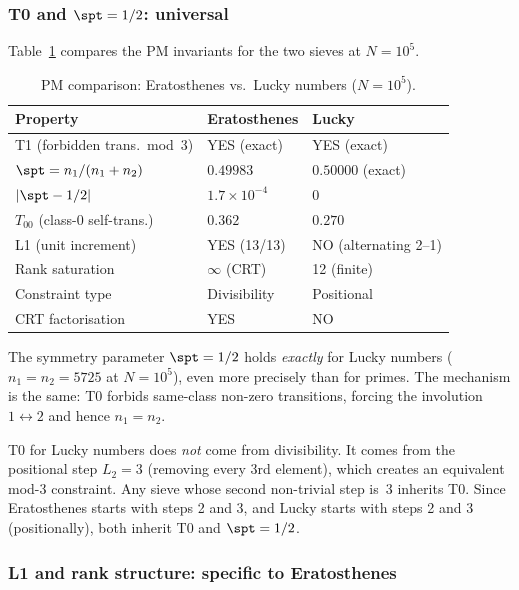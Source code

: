 \documentclass[12pt,a4paper]{article}
\begin{document}
\subsubsection{T0 and $\spt = 1/2$: universal}

Table~\ref{tab:PM_lucky} compares the PM invariants for the two sieves at $N = 10^5$.

\begin{table}[htbp]
\centering
\caption{PM comparison: Eratosthenes vs.\ Lucky numbers ($N = 10^5$).}
\label{tab:PM_lucky}
\begin{tabular}{lll}
\toprule
\textbf{Property} & \textbf{Eratosthenes} & \textbf{Lucky} \\
\midrule
T1 (forbidden trans.\ mod~3) & YES (exact) & YES (exact) \\
$\spt = n_1/(n_1 + n_2)$ & $0.49983$ & $0.50000$ (exact) \\
$|\spt - 1/2|$ & $1.7 \times 10^{-4}$ & $0$ \\
$T_{00}$ (class-0 self-trans.) & $0.362$ & $0.270$ \\
L1 (unit increment) & YES (13/13) & NO (alternating 2--1) \\
Rank saturation & $\infty$ (CRT) & 12 (finite) \\
Constraint type & Divisibility & Positional \\
CRT factorisation & YES & NO \\
\bottomrule
\end{tabular}
\end{table}

\noindent
The symmetry parameter $\spt = 1/2$ holds \emph{exactly} for Lucky numbers
($n_1 = n_2 = 5725$ at $N = 10^5$), even more precisely than for primes.
The mechanism is the same: T0 forbids same-class non-zero transitions,
forcing the involution $1 \leftrightarrow 2$ and hence $n_1 = n_2$.

\begin{remark}
T0 for Lucky numbers does \emph{not} come from divisibility.  It comes from
the positional step $L_2 = 3$ (removing every 3rd element), which creates an
equivalent mod-3 constraint.  Any sieve whose second non-trivial step is~3
inherits T0.  Since Eratosthenes starts with steps 2 and 3, and Lucky starts
with steps 2 and 3 (positionally), both inherit T0 and $\spt = 1/2$.
\end{remark}

\subsubsection{L1 and rank structure: specific to Eratosthenes}
\end{document}
